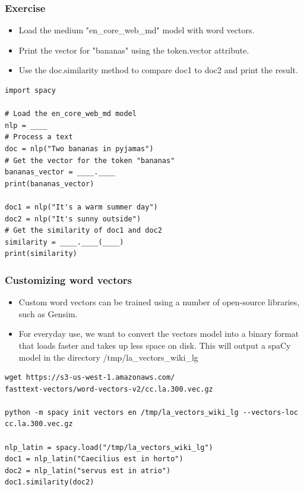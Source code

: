 \begin{frame}[fragile]\frametitle{Exercise}

\begin{itemize}
\item Load the medium "en\_core\_web\_md" model with word vectors.
\item Print the vector for "bananas" using the token.vector attribute.
\item Use the doc.similarity method to compare doc1 to doc2 and print the result.

\end{itemize}


\begin{lstlisting}
import spacy

# Load the en_core_web_md model
nlp = ____
# Process a text
doc = nlp("Two bananas in pyjamas")
# Get the vector for the token "bananas"
bananas_vector = ____.____
print(bananas_vector)

doc1 = nlp("It's a warm summer day")
doc2 = nlp("It's sunny outside")
# Get the similarity of doc1 and doc2
similarity = ____.____(____)
print(similarity)
\end{lstlisting}


\end{frame}


\begin{frame}[fragile]\frametitle{Customizing word vectors}

\begin{itemize}
\item Custom word vectors can be trained using a number of open-source libraries, such as Gensim.
\item For everyday use, we want to convert the vectors model into a binary format that loads faster and takes up less space on disk.
This will output a spaCy model in the directory /tmp/la\_vectors\_wiki\_lg
\end{itemize}

\begin{lstlisting}
wget https://s3-us-west-1.amazonaws.com/
fasttext-vectors/word-vectors-v2/cc.la.300.vec.gz

python -m spacy init vectors en /tmp/la_vectors_wiki_lg --vectors-loc cc.la.300.vec.gz

nlp_latin = spacy.load("/tmp/la_vectors_wiki_lg")
doc1 = nlp_latin("Caecilius est in horto")
doc2 = nlp_latin("servus est in atrio")
doc1.similarity(doc2)
\end{lstlisting}


\end{frame}

